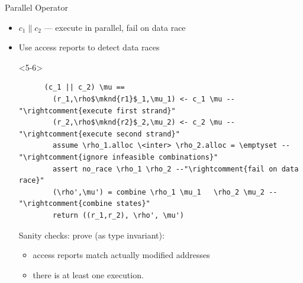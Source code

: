 \documentclass[fleqn]{beamer}
\begin{document}
\begin{frame}[t,fragile]{Parallel Operator}
  \newcommand{\mknd}[1]{\makebox[0pt]{\tikz[remember picture]{\node (#1) {};}}}

  \begin{itemize}
   \item<2-> $c_1 \parallel c_2$ --- execute in parallel, fail on data race
   \item<3-> Use access reports to detect data races



    \begin{onlyenv}<5-6>
    \begin{lstlisting}
      (c_1 || c_2) \mu ==
        (r_1,\rho$\mknd{r1}$_1,\mu_1) <- c_1 \mu --"\rightcomment{execute first strand}"
        (r_2,\rho$\mknd{r2}$_2,\mu_2) <- c_2 \mu --"\rightcomment{execute second strand}"
        assume \rho_1.alloc \<inter> \rho_2.alloc = \emptyset --"\rightcomment{ignore infeasible combinations}"
        assert no_race \rho_1 \rho_2 --"\rightcomment{fail on data race}"
        (\rho',\mu') = combine \rho_1 \mu_1   \rho_2 \mu_2 --"\rightcomment{combine states}"
        return ((r_1,r_2), \rho', \mu')
    \end{lstlisting}

    Sanity checks: prove (as type invariant):
      \begin{itemize}
       \item access reports match actually modified addresses
       \item there is at least one execution.


%


\end{itemize}
\end{onlyenv}
\end{itemize}
\end{frame}
\end{document}
